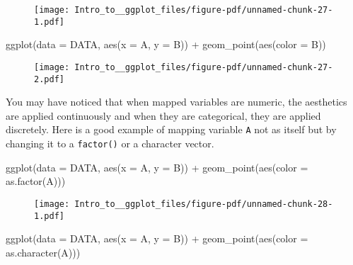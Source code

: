 \documentclass[
  letterpaper,
  DIV=11,
  numbers=noendperiod]{scrartcl}
\newenvironment{Shaded}{\begin{snugshade}}{\end{snugshade}}
\newcommand{\AttributeTok}[1]{\textcolor[rgb]{0.40,0.45,0.13}{#1}}
\newcommand{\FunctionTok}[1]{\textcolor[rgb]{0.28,0.35,0.67}{#1}}
\newcommand{\NormalTok}[1]{\textcolor[rgb]{0.00,0.23,0.31}{#1}}
\newcommand{\SpecialCharTok}[1]{\textcolor[rgb]{0.37,0.37,0.37}{#1}}
\begin{document}
\begin{figure}[H]

{\centering \texttt{[image: Intro\_to\_\_ggplot\_files/figure-pdf/unnamed-chunk-27-1.pdf]}

}

\end{figure}

\begin{Shaded}
\begin{Highlighting}[]
\FunctionTok{ggplot}\NormalTok{(}\AttributeTok{data =}\NormalTok{ DATA, }\FunctionTok{aes}\NormalTok{(}\AttributeTok{x =}\NormalTok{ A, }\AttributeTok{y =}\NormalTok{ B)) }\SpecialCharTok{+} 
  \FunctionTok{geom\_point}\NormalTok{(}\FunctionTok{aes}\NormalTok{(}\AttributeTok{color =}\NormalTok{ B))}
\end{Highlighting}
\end{Shaded}

\begin{figure}[H]

{\centering \texttt{[image: Intro\_to\_\_ggplot\_files/figure-pdf/unnamed-chunk-27-2.pdf]}

}

\end{figure}

You may have noticed that when mapped variables are numeric, the
aesthetics are applied continuously and when they are categorical, they
are applied discretely. Here is a good example of mapping variable
\texttt{A} not as itself but by changing it to a \texttt{factor()} or a
character vector.

\begin{Shaded}
\begin{Highlighting}[]
\FunctionTok{ggplot}\NormalTok{(}\AttributeTok{data =}\NormalTok{ DATA, }\FunctionTok{aes}\NormalTok{(}\AttributeTok{x =}\NormalTok{ A, }\AttributeTok{y =}\NormalTok{ B)) }\SpecialCharTok{+} 
  \FunctionTok{geom\_point}\NormalTok{(}\FunctionTok{aes}\NormalTok{(}\AttributeTok{color =} \FunctionTok{as.factor}\NormalTok{(A)))}
\end{Highlighting}
\end{Shaded}

\begin{figure}[H]

{\centering \texttt{[image: Intro\_to\_\_ggplot\_files/figure-pdf/unnamed-chunk-28-1.pdf]}

}

\end{figure}

\begin{Shaded}
\begin{Highlighting}[]
\FunctionTok{ggplot}\NormalTok{(}\AttributeTok{data =}\NormalTok{ DATA, }\FunctionTok{aes}\NormalTok{(}\AttributeTok{x =}\NormalTok{ A, }\AttributeTok{y =}\NormalTok{ B)) }\SpecialCharTok{+} 
  \FunctionTok{geom\_point}\NormalTok{(}\FunctionTok{aes}\NormalTok{(}\AttributeTok{color =} \FunctionTok{as.character}\NormalTok{(A)))}
\end{Highlighting}
\end{Shaded}
\end{document}

